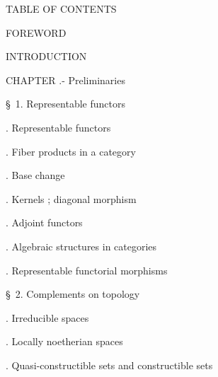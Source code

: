 
\begin{center}
TABLE OF CONTENTS
\end{center}

\noindent FOREWORD \dotfill

\noindent INTRODUCTION\dotfill

\noindent CHAPTER  .- Preliminaries\dotfill

\noindent\quad \S\ 1. Representable functors\dotfill

\noindent{}. Representable functors\dotfill

\noindent{}. Fiber products in a category\dotfill

\noindent{}. Base change\dotfill

\noindent{}. Kernels ; diagonal morphism\dotfill

\noindent{}. Adjoint functors\dotfill

\noindent{}. Algebraic structures in categories\dotfill

\noindent{}. Representable functorial morphisms\dotfill

\noindent\quad \S\ 2. Complements on topology\dotfill

\noindent{}. Irreducible spaces\dotfill

\noindent{}. Locally noetherian spaces\dotfill

\noindent{}. Quasi-constructible sets and constructible sets\dotfill

